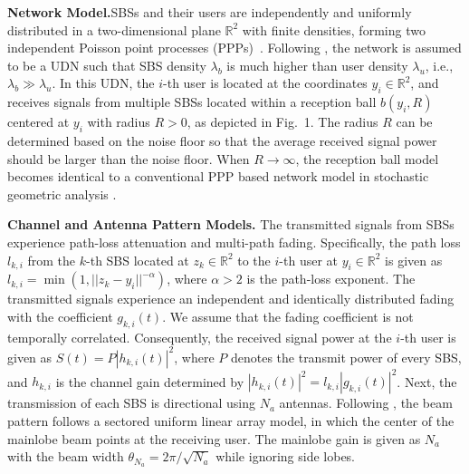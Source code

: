 \documentclass{book}
\begin{document}
\textbf{Network Model.}\quad SBSs and their users are independently and uniformly distributed in a two-dimensional plane $\mathbb{R}^2$ with finite densities, forming two independent Poisson point processes (PPPs)~\cite{interf_udn,interf_var}. Following \cite{interf_udn}, the network is assumed to be a UDN such that SBS density $\lambda_b$ is much higher than user density $\lambda_u$, i.e., $\lambda_b \gg \lambda_u$. In this UDN, the $i$-th user is located at the coordinates $y_i\in\mathbb{R}^2$, and receives signals from multiple SBSs located within a reception ball $b(y_i,R)$ centered at $y_i$ with radius $R>0$, as depicted in Fig.~1. The radius $R$ can be determined based on the noise floor so that the average received signal power should be larger than the noise floor. When $R\rightarrow \infty$, the reception ball model becomes identical to a conventional PPP based network model in stochastic geometric analysis \cite{interf_var,finitePPP}.

\textbf{Channel and Antenna Pattern Models.}\quad
The transmitted signals from SBSs experience path-loss attenuation and multi-path fading. Specifically, the path loss $l_{k,i}$ from the $k$-th SBS located at $z_k\in\mathbb{R}^2$ to the $i$-th user at $y_i\in\mathbb{R}^2$ is given as $l_{k,i}=\min(1,||z_k-y_i||^{-\alpha})$, where $\alpha>2$ is the path-loss exponent. The transmitted signals experience an independent and identically distributed fading with the coefficient $g_{k,i}(t)$. We assume that the fading coefficient is not temporally correlated. Consequently, the received signal power at the $i$-th user is given as $S(t)=P|h_{k,i}(t)|^2$, where $P$ denotes the transmit power of every SBS, and $h_{k,i}$ is the channel gain determined by $|h_{k,i}(t)|^2=l_{k,i}|g_{k,i}(t)|^2$. Next, the transmission of each SBS is directional using $N_a$ antennas. Following \cite{MIMO}, the beam pattern follows a sectored uniform linear array model, in which the center of the mainlobe beam points at the receiving user. The mainlobe gain is given as $N_a$ with the beam width $\theta_{N_a} = 2\pi/\sqrt{N_a}$ while ignoring side lobes.
\end{document}
